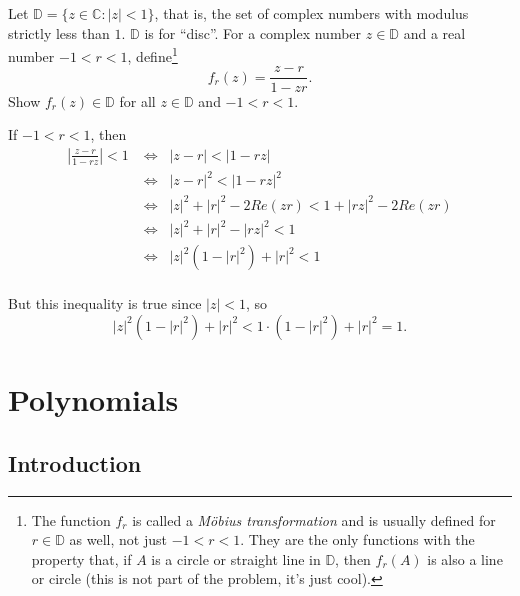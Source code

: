 \documentclass[11pt,dvipsnames]{book}
\numberwithin{equation}{section} %
\numberwithin{figure}{section} %
\numberwithin{table}{section} %
\begin{document}
\begin{exercise} Let $\mathbb{D}=\{z\in \mathbb{C}: |z|<1\}$, that is, the set of complex numbers with modulus strictly less than $1$. \(\mathbb{D}\) is for ``disc''. For a complex number $z\in \mathbb{D}$ and a real number $-1< r<1$, define\footnote{The function $f_{r}$ is called a {\it M\"obius transformation} and is usually defined for $r\in \mathbb{D}$ as well, not just $-1<r<1$. They are the only functions with the property that, if $A$ is a circle or straight line in $\mathbb{D}$, then $f_{r}(A)$ is also a line or circle (this is not part of the problem, it's just cool).}
\[
f_{r}(z) = \frac{z-r}{1-zr}.\]
 Show $f_{r}(z)\in \mathbb{D}$ for all $z\in \mathbb{D}$ and $-1<r<1$.


\begin{solution}
If $-1<r<1$, then
\begin{align*}
\left|\frac{z-r}{1-rz}\right|<1
& \Leftrightarrow \;\;|z-r|<|1-rz|\\
&  \Leftrightarrow \;\; |z-r|^{2}<|1-rz|^{2}\\
& \Leftrightarrow \;\; |z|^{2}+|r|^{2}-2Re(zr)<1+|rz|^{2}-2Re(zr)\\
& \Leftrightarrow \;\; |z|^{2}+|r|^{2}-|rz|^{2}<1\\
& \Leftrightarrow \;\; |z|^{2}(1-|r|^{2})+|r|^{2}<1\\
\end{align*}

But this inequality is true since $|z|<1$, so
\[
|z|^{2}(1-|r|^{2})+|r|^{2}<1\cdot (1-|r|^{2})+|r|^{2}=1. 
\]

\end{solution}


\end{exercise}

\chapter{Polynomials}
%
%
%
%

\section{Introduction}
\end{document}
